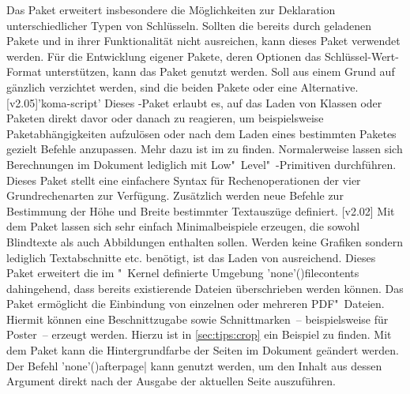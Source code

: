 \begin{DeclarePackages}
  Das Paket  erweitert insbesondere die Möglichkeiten zur 
  Deklaration unterschiedlicher Typen von Schlüsseln. Sollten die bereits durch 
  \TUDScript geladenen Pakete  und  in ihrer 
  Funktionalität nicht ausreichen, kann dieses Paket verwendet werden. Für die 
  Entwicklung eigener Pakete, deren Optionen das Schlüssel-Wert-Format 
  unterstützen, kann das Paket  genutzt werden. Soll aus einem 
  Grund auf \KOMAScript{} gänzlich verzichtet werden, sind die beiden Pakete 
   oder  eine Alternative.
[v2.05]'koma-script'
  Dieses \KOMAScript-Paket erlaubt es, auf das Laden von Klassen oder Paketen 
  direkt davor oder danach zu reagieren, um beispielsweise Paketabhängigkeiten 
  aufzulösen oder nach dem Laden eines bestimmten Paketes gezielt Befehle 
  anzupassen. Mehr dazu ist im \scrguide zu finden.
  Normalerweise lassen sich Berechnungen im Dokument lediglich mit 
  Low"~Level"~-Primitiven durchführen. Dieses Paket stellt eine 
  einfachere Syntax für Rechenoperationen der vier Grundrechenarten zur 
  Verfügung. Zusätzlich werden neue Befehle zur Bestimmung der Höhe und Breite 
  bestimmter Textauszüge definiert.
[v2.02]
  Mit dem Paket  lassen sich sehr einfach Minimalbeispiele 
  erzeugen, die sowohl Blindtexte als auch Abbildungen enthalten sollen. Werden 
  keine Grafiken sondern lediglich Textabschnitte etc. benötigt, ist das Laden 
  von  ausreichend.
  Dieses Paket erweitert die im "~Kernel definierte Umgebung 
  \Environment'none'(){filecontents} dahingehend,
  dass bereits existierende Dateien überschrieben werden können.
  Das Paket ermöglicht die Einbindung von einzelnen oder mehreren PDF"~Dateien.
  Hiermit können eine Beschnittzugabe sowie Schnittmarken~-- beispielsweise für 
  Poster~-- erzeugt werden. Hierzu ist in \autoref{sec:tips:crop} ein Beispiel 
  zu finden.
  Mit dem Paket kann die Hintergrundfarbe der Seiten im Dokument geändert 
  werden.
  Der Befehl \Macro'none'(){afterpage|\MPValue{\dots}} 
  kann genutzt werden, um den Inhalt aus dessen Argument direkt nach der 
  Ausgabe der aktuellen Seite auszuführen.

\end{DeclarePackages}
